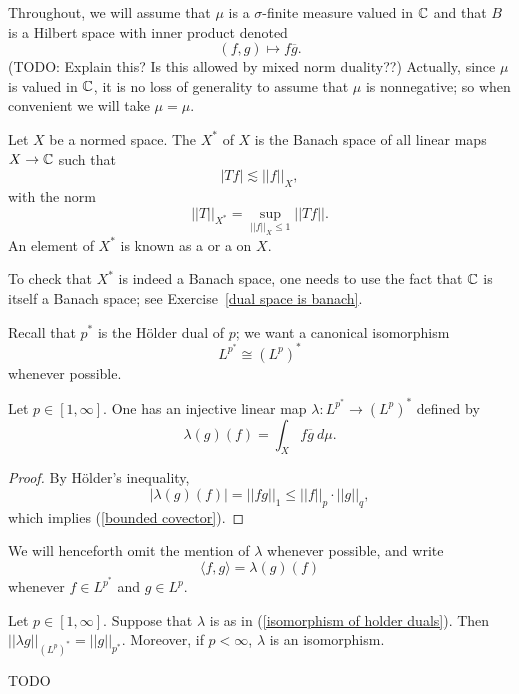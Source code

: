 Throughout, we will assume that $\mu$ is a $\sigma$-finite measure valued in $\mathbb{C}$ and that $B$ is a Hilbert space with inner product denoted
\[(f, g) \mapsto f \overline g.\]
(TODO: Explain this? Is this allowed by mixed norm duality??)
Actually, since $\mu$ is valued in $\mathbb{C}$, it is no loss of generality to assume that $\mu$ is nonnegative; so when convenient we will take $\mu = \mu$.

\begin{definition}
Let $X$ be a normed space.
The  $X^*$ of $X$ is the Banach space of all linear maps $X \to \mathbb{C}$ such that
\begin{equation}
\label{bounded covector}
|Tf| \lesssim ||f||_X,
\end{equation}
with the norm
\[||T||_{X^*} = \sup_{||f||_{X} \leq 1} ||Tf||.\]
An element of $X^*$ is known as a  or a  on $X$.
\end{definition}

To check that $X^*$ is indeed a Banach space, one needs to use the fact that $\mathbb{C}$ is itself a Banach space; see Exercise~\ref{dual space is banach}.

Recall that $p^*$ is the H\"older dual of $p$; we want a canonical isomorphism
\[L^{p^*} \cong (L^p)^*\]
whenever possible.

\begin{lemma}
Let $p \in [1, \infty]$.
One has an injective linear map $\lambda: L^{p^*} \to (L^p)^*$ defined by
\begin{equation}
\label{isomorphism of holder duals}
\lambda(g)(f) = \int_{X} f\overline g ~d\mu.
\end{equation}
\end{lemma}
\begin{proof}
By H\"older's inequality,
\[|\lambda(g)(f)| = ||fg||_1 \leq ||f||_{p}  \cdot ||g||_q,\]
which implies (\ref{bounded covector}).
\end{proof}

We will henceforth omit the mention of $\lambda$ whenever possible, and write
\[\langle f, g\rangle = \lambda(g)(f)\]
whenever $f \in L^{p^*}$ and $g \in L^p$.

\begin{theorem}
Let $p \in [1, \infty]$.
Suppose that $\lambda$ is as in (\ref{isomorphism of holder duals}).
Then $||\lambda g||_{(L^p)^*} = ||g||_{p^*}$.
Moreover, if $p < \infty$, $\lambda$ is an isomorphism.
\end{theorem}
TODO

